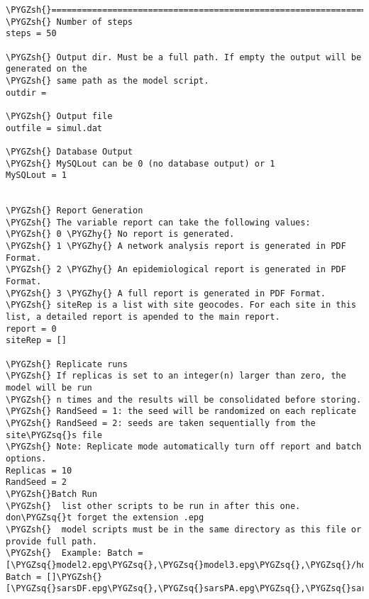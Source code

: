 \documentclass[a4paper,10pt,english]{sphinxmanual}
\def\PYGZsh{\char`\#}
\def\PYGZhy{\char`\-}
\def\PYGZsq{\char`\'}
\begin{document}
\begin{Verbatim}[commandchars=\\\{\}]
\PYGZsh{}==============================================================\PYGZsh{}
\PYGZsh{} Number of steps
steps = 50

\PYGZsh{} Output dir. Must be a full path. If empty the output will be generated on the
\PYGZsh{} same path as the model script.
outdir =

\PYGZsh{} Output file
outfile = simul.dat

\PYGZsh{} Database Output
\PYGZsh{} MySQLout can be 0 (no database output) or 1
MySQLout = 1


\PYGZsh{} Report Generation
\PYGZsh{} The variable report can take the following values:
\PYGZsh{} 0 \PYGZhy{} No report is generated.
\PYGZsh{} 1 \PYGZhy{} A network analysis report is generated in PDF Format.
\PYGZsh{} 2 \PYGZhy{} An epidemiological report is generated in PDF Format.
\PYGZsh{} 3 \PYGZhy{} A full report is generated in PDF Format.
\PYGZsh{} siteRep is a list with site geocodes. For each site in this list, a detailed report is apended to the main report.
report = 0
siteRep = []

\PYGZsh{} Replicate runs
\PYGZsh{} If replicas is set to an integer(n) larger than zero, the model will be run
\PYGZsh{} n times and the results will be consolidated before storing.
\PYGZsh{} RandSeed = 1: the seed will be randomized on each replicate
\PYGZsh{} RandSeed = 2: seeds are taken sequentially from the site\PYGZsq{}s file
\PYGZsh{} Note: Replicate mode automatically turn off report and batch options.
Replicas = 10
RandSeed = 2
\PYGZsh{}Batch Run
\PYGZsh{}  list other scripts to be run in after this one. don\PYGZsq{}t forget the extension .epg
\PYGZsh{}  model scripts must be in the same directory as this file or provide full path.
\PYGZsh{}  Example: Batch = [\PYGZsq{}model2.epg\PYGZsq{},\PYGZsq{}model3.epg\PYGZsq{},\PYGZsq{}/home/jose/model4.epg\PYGZsq{}]
Batch = []\PYGZsh{}[\PYGZsq{}sarsDF.epg\PYGZsq{},\PYGZsq{}sarsPA.epg\PYGZsq{},\PYGZsq{}sarsRS.epg\PYGZsq{}]
\end{Verbatim}
\end{document}
